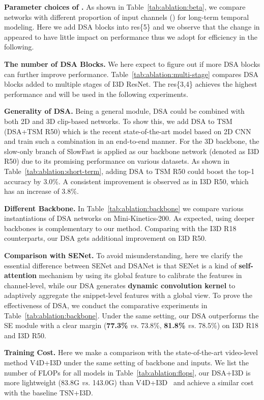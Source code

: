 \documentclass[sigconf]{acmart}
\begin{document}
{{\textbf{Parameter choices of .} 
As shown in Table~\ref{tab:ablation:beta}, we compare networks with different proportion of input channels () for long-term temporal modeling. Here we add DSA blocks into res\{5\} and we observe that the change in  appeared to have little impact on performance thus we adopt  for efficiency in the following. 

\textbf{The number of DSA Blocks.} 
We here expect to figure out if more DSA blocks can further improve performance. Table~\ref{tab:ablation:multi-stage} compares DSA blocks added to multiple stages of I3D ResNet. The res\{3,4\} achieves the highest performance and will be used in the following experiments.





\textbf{Generality of DSA.} 
Being a general module, DSA could be combined with both 2D and 3D clip-based networks. 
To show this, we add DSA to TSM (DSA+TSM R50) which is the recent state-of-the-art model based on 2D CNN and train such a combination in an end-to-end manner. 
For the 3D backbone, the slow-only branch of SlowFast is applied as our backbone network (denoted as I3D R50) due to its promising performance on various datasets.
As shown in Table~\ref{tab:ablation:short-term}, adding DSA to TSM R50 could boost the top-1 accuracy by 3.0\%. A consistent improvement is observed as in I3D R50, which has an increase of 3.8\%.



\textbf{Different Backbone.}
In Table~\ref{tab:ablation:backbone} we compare various instantiations of DSA networks on Mini-Kinetics-200. 
As expected, using deeper backbones is complementary to our method. Comparing with the I3D R18 counterparts, our DSA gets additional improvement on I3D R50. 

\textbf{Comparison with SENet.}
To avoid misunderstanding, here we clarify the essential difference between SENet and DSANet is that SENet is a kind of \textbf{self-attention} mechanism by using its global feature to calibrate the features in channel-level, while our DSA generates \textbf{dynamic convolution kernel} to adaptively aggregate the snippet-level features with a global view.
To prove the effectiveness of DSA, we conduct the comparative experiments in Table~\ref{tab:ablation:backbone}. Under the same setting, our DSA outperforms the SE module with a clear margin (\textbf{77.3\%} \emph{vs.} 73.8\%, \textbf{81.8\%} \emph{vs.} 78.5\%) on I3D R18 and I3D R50. 


\textbf{Training Cost.}
Here we make a comparison with the state-of-the-art video-level method V4D+I3D under the same setting of backbone and inputs. 
We list the number of FLOPs for all models in Table~\ref{tab:ablation:flops}, our DSA+I3D is more lightweight (83.8G \emph{vs.} 143.0G) than V4D+I3D~\cite{zhang2020v4d} and achieve a similar cost with the baseline TSN+I3D. 








}}
\end{document}
